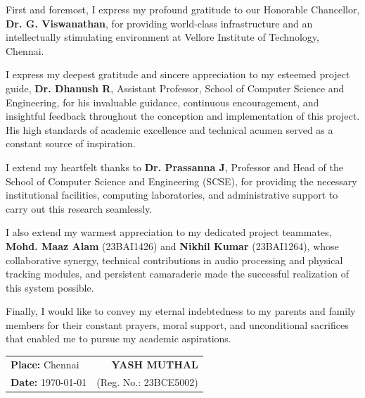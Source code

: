 \documentclass[12pt,a4paper,oneside]{report}
\begin{document}
First and foremost, I express my profound gratitude to our Honorable Chancellor, \textbf{Dr. G. Viswanathan}, for providing world-class infrastructure and an intellectually stimulating environment at Vellore Institute of Technology, Chennai.

I express my deepest gratitude and sincere appreciation to my esteemed project guide, \textbf{Dr. Dhanush R}, Assistant Professor, School of Computer Science and Engineering, for his invaluable guidance, continuous encouragement, and insightful feedback throughout the conception and implementation of this project. His high standards of academic excellence and technical acumen served as a constant source of inspiration.

I extend my heartfelt thanks to \textbf{Dr. Prassanna J}, Professor and Head of the School of Computer Science and Engineering (SCSE), for providing the necessary institutional facilities, computing laboratories, and administrative support to carry out this research seamlessly.

I also extend my warmest appreciation to my dedicated project teammates, \textbf{Mohd. Maaz Alam} (23BAI1426) and \textbf{Nikhil Kumar} (23BAI1264), whose collaborative synergy, technical contributions in audio processing and physical tracking modules, and persistent camaraderie made the successful realization of this system possible.

Finally, I would like to convey my eternal indebtedness to my parents and family members for their constant prayers, moral support, and unconditional sacrifices that enabled me to pursue my academic aspirations.

\vspace{1.8cm}
\noindent
\begin{tabular*}{\textwidth}{@{\extracolsep{\fill}}lr}
\textbf{Place:} Chennai & \textbf{YASH MUTHAL} \\
\textbf{Date:} \today   & (Reg. No.: 23BCE5002)
\end{tabular*}

\clearpage
\tableofcontents

\clearpage
\listoftables

\clearpage
\listoffigures
\end{document}
